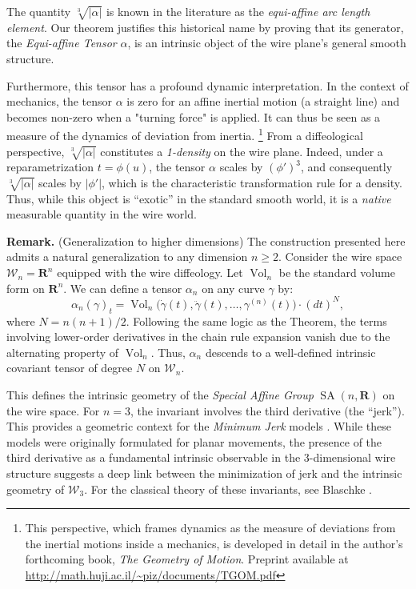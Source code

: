 \documentclass[10pt,letterpaper,reqno]{amsart}
\newcommand{\RR}{\mathbf{R}}
\newcommand{\cW}{\mathcal{W}}
\DeclareMathOperator{\SA}{SA}
\DeclareMathOperator{\vol}{Vol}
\begin{document}
  The quantity $\sqrt[3]{|\alpha|}$ is known in the literature as the \emph{equi-affine arc length element}.
  Our theorem justifies this historical name by proving that its generator,
  the \emph{Equi-affine Tensor} $\alpha$,
  is an intrinsic object of the wire plane's general smooth structure.
  
  Furthermore,
  this tensor has a profound dynamic interpretation.
  In the context of mechanics,
  the tensor $\alpha$ is zero for an affine inertial motion (a straight line) and becomes non-zero when a "turning force" is applied.
  It can thus be seen as a measure of the dynamics of deviation from inertia.%
  \footnote{This perspective,
  which frames dynamics as the measure of deviations from the inertial motions inside a mechanics,
  is developed in detail in the author's forthcoming book,
  \emph{The Geometry of Motion}.
  Preprint available at \url{http://math.huji.ac.il/~piz/documents/TGOM.pdf}}
  From a diffeological perspective, $\sqrt[3]{|\alpha|}$ constitutes a \emph{1-density} on the wire plane.
  Indeed, under a reparametrization $t = \phi(u)$,
  the tensor $\alpha$ scales by $(\phi')^3$,
  and consequently $\sqrt[3]{|\alpha|}$ scales by $|\phi'|$,
  which is the characteristic transformation rule for a density.
  Thus,
  while this object is ``exotic'' in the standard smooth world, it is a \emph{native} measurable quantity in the wire world.
  
  \textbf{Remark.} (Generalization to higher dimensions)
  The construction presented here admits a natural generalization to any dimension $n \ge 2$.
  Consider the wire space $\cW_{\!n} = \RR^n$ equipped with the wire diffeology.
  Let $\vol_n$ be the standard volume form on $\RR^n$.
  We can define a tensor $\alpha_n$ on any curve $\gamma$ by:
  $$
    \alpha_n(\gamma)_t = \vol_n\big(\dot{\gamma}(t), \ddot{\gamma}(t), \dots, \gamma^{(n)}(t)\big) \cdot (dt)^{N},
    $$
  where $N = n(n+1)/2$.
  Following the same logic as the Theorem, the terms involving lower-order derivatives in the chain rule expansion vanish due to the alternating property of $\vol_n$.
  Thus, $\alpha_n$ descends to a well-defined intrinsic covariant tensor of degree $N$ on $\cW_{\!n}$.
  
  This defines the intrinsic geometry of the \emph{Special Affine Group} $\SA(n, \RR)$ on the wire space.
  For $n=3$, the invariant involves the third derivative (the ``jerk'').
  This provides a geometric context for the \emph{Minimum Jerk} models \cite{FH85}.
  While these models were originally formulated for planar movements,
  the presence of the third derivative as a fundamental intrinsic observable in the 3-dimensional wire structure suggests a deep link between the minimization of jerk and the intrinsic geometry of $\cW_3$.
  For the classical theory of these invariants,
  see Blaschke \cite{Bla23}.
  
\end{document}
